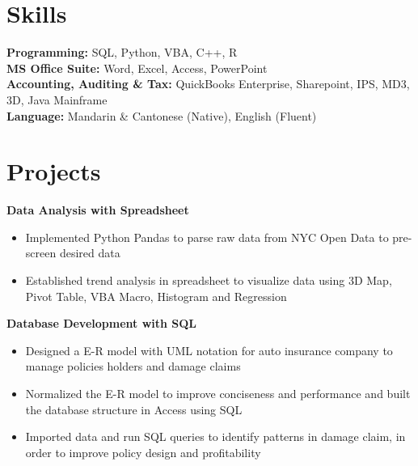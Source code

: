 \documentclass[10pt]{article} %
\begin{document}
{\begin{minipage}[t]{0.5\textwidth}
\end{minipage} %
\hfill
\begin{minipage}[t]{0.47\textwidth} %
\vspace{0pt} %


\section{Skills} 
  \textbf{Programming:} SQL, Python, VBA, C++, R\\
  \textbf{MS Office Suite:} Word, Excel, Access, PowerPoint\\
  \textbf{Accounting, Auditing \& Tax:} QuickBooks Enterprise, Sharepoint, IPS, MD3, 3D, Java Mainframe \\
  \textbf{Language:} Mandarin \& Cantonese (Native), English (Fluent)


\section{Projects} 

{\raggedright\normalsize
\textbf{Data Analysis with Spreadsheet}}

\begin{itemize}[leftmargin=*, topsep=2pt, partopsep=2.5pt]
\setlength\itemsep{1pt}
\item Implemented Python Pandas to parse raw data from NYC Open Data to pre-screen desired data    
\item Established trend analysis in spreadsheet to visualize data using 3D Map, Pivot Table, VBA Macro, Histogram and Regression
\end{itemize}




{\raggedright\normalsize
\textbf{Database Development with SQL}}

\begin{itemize}[leftmargin=*, topsep=2pt, partopsep=2.5pt]
\setlength\itemsep{1pt}
\item Designed a E-R model with UML notation for auto insurance company to manage policies holders and damage claims    
\item Normalized the E-R model to improve conciseness and performance and built the database structure in Access using SQL
\item Imported data and run SQL queries to identify patterns in damage claim, in order to improve policy design and profitability


\end{itemize}
\end{minipage}}
\end{document}
